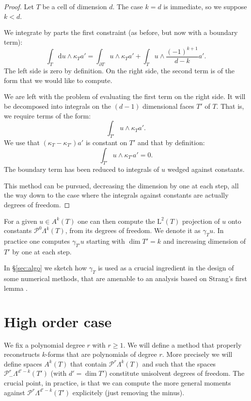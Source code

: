\documentclass[10pt,a4paper]{article}
\newcommand{\rmd}{\mathrm{d}}
\newcommand{\rmL}{\mathrm{L}}
\newcommand{\calP}{\mathcal{P}}
\newcommand{\Poly}{\calP}
\newcommand{\Pminus}{\Poly_{\!\!-}}
\theoremstyle{remark}
\theoremstyle{definition}
\numberwithin{equation}{section}
\begin{document}
\begin{proof}
  Let $T$ be a cell of dimension $d$. The case $k = d$ is immediate, so we suppose $k < d$.

  We integrate by parts the first constraint (as before, but now with a boundary term):
  \begin{equation}
    \int_T \rmd u \wedge \kappa_T a'  = \int_{\partial T} u \wedge \kappa_T a' + \int_T u \wedge \frac{(-1)^{k+1}}{d-k} a'. 
  \end{equation}
  The left side is zero by definition. On the right side, the second term is of the form that we would like to compute.

  We are left with the problem of evaluating the first term on the right side. It will be decomposed into integrals on the $(d-1)$ dimensional faces $T'$ of $T$. That is, we require terms of the form:
  \begin{equation}
    \int_{T'} u \wedge \kappa_T a'.
  \end{equation}
We use that $(\kappa_T -\kappa_{T'})a'$ is constant on $T'$ and that by definition:
  \begin{equation}
    \int_{T'} u \wedge \kappa_{T'} a' = 0.
  \end{equation}
The boundary term has been reduced to integrals of $u$ wedged against constants.

This method can be pursued, decreasing the dimension by one at each step, all the way down to the case where the integrals against constants are actually degrees of freedom. 
  \end{proof}

For a given $u \in A^k(T)$ one can then compute the $\rmL^2(T)$ projection of $u$ onto constants $\Poly^0 \Lambda^k(T)$, from its degrees of freedom. We denote it as $\gamma_T u$.  In practice one computes $\gamma_{T'} u$ starting with $\dim T' = k$ and increasing dimension of $T'$ by one at each step.

In \S \ref{sec:algo} we sketch how $\gamma_T$ is used as a crucial ingredient in the design of some numerical methods, that are amenable to an analysis based on Strang's first lemma \cite[Theorem 26.1 p. 192]{Cia91}.
  

\section{High order case\label{sec:high}}
We fix a polynomial degree $r$ with $r \geq 1$. We will define a method that properly reconstructs $k$-forms that are polynomials of degree $r$. More precisely we will define spaces $A^k(T)$ that contain $\Poly^r \Lambda^k(T)$ and such that the spaces $\Pminus^r \Lambda^{d'-k}(T')$ (with $d' = \dim T'$) constitute unisolvent degrees of freedom. The crucial point, in practice, is that we can compute the more general moments against $\Poly^r \Lambda^{d'-k} (T')$ explicitely (just removing the minus).
\end{document}
